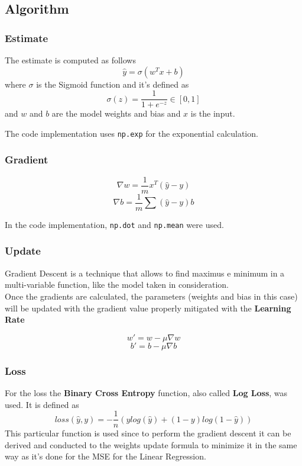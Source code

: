 \documentclass[
	letterpaper, %
	10pt, %
]{class}
\begin{document}
\subsection{Algorithm}

\subsubsection{Estimate}
The estimate is computed as follows
$$ \hat{y} = \sigma(w^Tx + b) $$
where $\sigma$ is the Sigmoid function \cite{sigmoid} and it's defined as
$$ \sigma(z) = \frac{1}{1 + e^{-z}} \in [0,1] $$
and $w$ and $b$ are the model weights and bias and $x$ is the input.

The code implementation uses \texttt{np.exp} for the exponential calculation.

\subsubsection{Gradient}

$$ \nabla w = \frac{1}{m}x^T(\hat{y} - y) $$
$$ \nabla b = \frac{1}{m}\sum(\hat{y} - y) b $$

In the code implementation, \texttt{np.dot} and \texttt{np.mean} were used.

\subsubsection{Update}

Gradient Descent \cite{sgd} is a technique that allows to find maximus e minimum in a multi-variable function, like the model taken in consideration.\\
Once the gradients are calculated, the parameters (weights and bias in this case) will be updated with the gradient value properly mitigated with the \textbf{Learning Rate}

$$ w' = w - \mu \nabla w $$
$$ b' = b - \mu \nabla b $$

\subsubsection{Loss}
For the loss the \textbf{Binary Cross Entropy} \cite{binarycrossentropy} function, also called \textbf{Log Loss}, was used.
It is defined as
$$ loss(\hat{y}, y) = -\frac{1}{n}(y log(\hat{y}) + (1-y)log(1-\hat{y})) $$
This particular function is used since to perform the gradient descent it can be derived and conducted to the weights update formula to minimize it in the same way as it's done for the MSE \cite{mse} for the Linear Regression.\\
\end{document}
